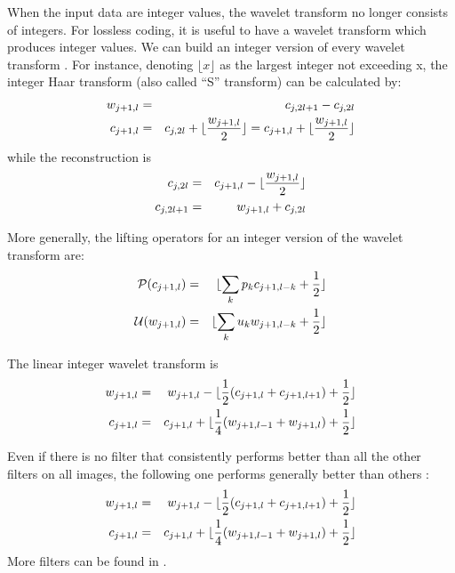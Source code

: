 When the input data are integer values, the wavelet transform no longer consists
of integers. For lossless coding, it is useful to have a wavelet 
transform which produces integer values.
We can build an integer version of every wavelet
transform \cite{wave:calderbank96}. For instance, denoting $\lfloor x \rfloor$ 
as the largest integer
not exceeding x, the integer Haar transform  (also called ``S'' transform)
can be calculated by:
\begin{eqnarray}
w_{j+1,l} & = & c_{j,2l+1} - c_{j,2l} \\ \nonumber
c_{j+1,l} & = & c_{j,2l} + \lfloor {w_{j+1,l} \over 2 } \rfloor = c_{j+1,l} + \lfloor {w_{j+1,l} \over 2 } \rfloor
\end{eqnarray}
while the reconstruction is
\begin{eqnarray}
c_{j,2l} & = &  c_{j+1,l} - \lfloor {w_{j+1,l} \over 2} \rfloor \\ \nonumber
c_{j,2l+1} & = &  w_{j+1,l} +  c_{j,2l}
\end{eqnarray}

More generally, the lifting operators for an integer version of the wavelet transform are:
\begin{eqnarray*}
{\cal P}(c_{j+1,l}) & = & \lfloor \sum_k p_k c_{j+1,l-k} + {1 \over 2 } \rfloor\\
 {\cal U}(w_{j+1,l}) & = &  \lfloor \sum_k u_k w_{j+1,l-k} + {1 \over 2 } \rfloor
\end{eqnarray*}

The linear integer wavelet transform is 
\begin{eqnarray*}
w_{j+1,l} & = & w_{j+1,l} - \lfloor {1 \over 2 }(c_{j+1,l}+c_{j+1,l+1})+ {1 \over 2 } \rfloor\\
c_{j+1,l} & = & c_{j+1,l} + \lfloor {1 \over 4 }(w_{j+1,l-1}+w_{j+1,l})+ {1 \over 2 } \rfloor
\end{eqnarray*}
  
Even if there is no filter that consistently performs better than all
the other filters on all images, the following one performs generally better
than others \cite{wave:calderbank96}:
\begin{eqnarray*}
w_{j+1,l} & = & w_{j+1,l} - \lfloor {1 \over 2 }(c_{j+1,l}+c_{j+1,l+1})+ {1 \over 2 } \rfloor\\
c_{j+1,l} & = & c_{j+1,l} + \lfloor {1 \over 4 }(w_{j+1,l-1}+w_{j+1,l})+ {1 \over 2 } \rfloor
\end{eqnarray*}
More filters can be found in \cite{wave:calderbank96}. 

